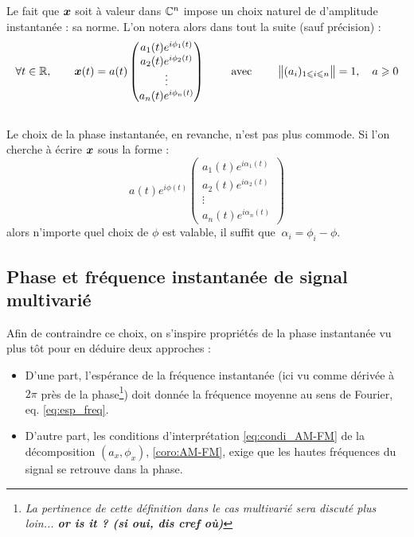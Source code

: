 Le fait que $\bf{x}$ soit à valeur dans $\C^n$ impose un choix naturel de d'amplitude instantanée : sa norme. L'on notera alors dans tout la suite (sauf précision) :
\[\forall t\in\R,\qquad 
\bf{x}(t) = a(t)\begin{pmatrix} a_1(t)e^{i\phi_1(t)} \\ a_2(t)e^{i\phi_2(t)} \\ \vdots \\ a_n(t)e^{i\phi_n(t)}
\end{pmatrix} \qquad\text{ avec }\qquad \big\|(a_i)_{1\leq i\leq n}\big\|=1,\quad a\geq 0
\]
\\
Le choix de la phase instantanée, en revanche, n'est pas plus commode. Si l'on cherche à écrire $\bf{x}$ sous la forme :
\[a(t)e^{i\phi(t)}\begin{pmatrix} a_1(t)e^{i\alpha_1(t)} \\ a_2(t)e^{i\alpha_2(t)} \\ \vdots \\ a_n(t)e^{i\alpha_n(t)}
\end{pmatrix}\]
alors n'importe quel choix de $\phi$ est valable, il suffit que $\ \alpha_i = \phi_i-\phi$.
\\



\subsection{Phase et fréquence instantanée de signal multivarié }\label{sec:param_instant_nvar}

Afin de contraindre ce choix, on s'inspire propriétés de la phase instantanée vu plus tôt pour en déduire deux approches :
\begin{itemize}
	\item D'une part, l'espérance de la fréquence instantanée (ici vu comme dérivée à $2\pi$ près de la phase\footnote{\itshape
		La pertinence de cette définition dans le cas multivarié sera discuté plus loin... \textbf{or is it ? (si oui, dis cref où)}})
	doit donnée la fréquence moyenne au sens de Fourier, eq. \eqref{eq:esp_freq}.
	
	\item D'autre part, les conditions d'interprétation \eqref{eq:condi_AM-FM} de la décomposition $(a_x,\phi_x)$, \cref{coro:AM-FM}, exige que les hautes fréquences du signal se retrouve dans la phase.
\end{itemize}

